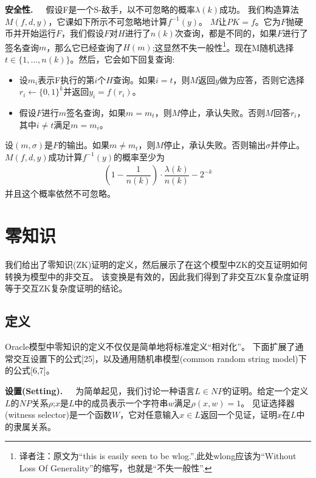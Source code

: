 \documentclass[]{article}
\begin{document}
    
    \textbf{安全性.}\ \ \ 
    假设F是一个S-敌手，以不可忽略的概率$\lambda(k)$成功。
    我们构造算法$M(f,d,y)$，它课如下所示不可忽略地计算$f^{-1}(y)$。
    $M$让$PK=f$。它为$F$抛硬币并开始运行$F$，我们假设$F$对$H$进行了$n(k)$次查询，都是不同的，如果$F$进行了签名查询$m$，那么它已经查询了$H(m)$;这显然不失一般性\footnote{译者注：原文为“this is easily seen to be wlog.”,此处wlong应该为“Without Loss Of Generality”的缩写，也就是“不失一般性”.}。现在M随机选择$t\in \{1,\ldots ,n(k)\}$。然后，它会如下回复查询:
    \begin{itemize}
    	\item 设$m_i$表示F执行的第$i$个$H$查询。如果$i = t$，则$M$返回$y$做为应答，否则它选择$r_i\leftarrow \{0,1\}^k$并返回$y_i=f(r_i)$。
    	\item 假设$F$进行$m$签名查询，如果$m=m_t$，则$M$停止，承认失败。否则$M$回答$r_i$，其中$i\neq t$满足$m=m_i$。
    \end{itemize}
    
    
    设$(m,\sigma)$是$F$的输出。如果$m\neq m_t$，则$M$停止，承认失败。否则输出$\sigma$并停止。$M(f,d,y)$成功计算$f^{-1}(y)$的概率至少为
    \begin{align*}
    	(1-\dfrac{1}{n(k)})\cdot \dfrac{\lambda (k)}{n(k)} - 2^{-k}
    \end{align*}
    并且这个概率依然不可忽略。
    
    
    \section{零知识}
    
    我们给出了零知识(ZK)证明的定义，然后展示了在这个模型中ZK的交互证明如何转换为模型中的非交互。
    该变换是有效的，因此我们得到了非交互ZK复杂度证明等于交互ZK复杂度证明的结论。
    
    \subsection{定义}
    
    Oracle模型中零知识的定义不仅仅是简单地将标准定义“相对化”。
    下面扩展了通常交互设置下的公式[25]，以及通用随机串模型(common random string model)下的公式[6,7]。
    
    
    \textbf{设置(Setting).}\ \ \ 
    为简单起见，我们讨论一种语言$L\in NP$的证明。给定一个定义$L$的$NP$关系$\rho$;$x$是$L$中的成员表示一个字符串$w$满足$\rho(x,w)=1$。
    见证选择器(witness selector)是一个函数$W$，它对任意输入$x\in L$返回一个见证，证明$x$在$L$中的隶属关系。
    
\end{document}
